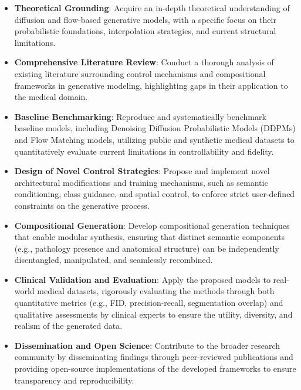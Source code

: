 \begin{itemize}
    \item \textbf{Theoretical Grounding}: Acquire an in-depth theoretical understanding of diffusion and flow-based generative models, with a specific focus 
    on their probabilistic foundations, interpolation strategies, and current structural limitations. 
    \item \textbf{Comprehensive Literature Review}: Conduct a thorough analysis of existing literature surrounding control mechanisms and compositional frameworks in 
    generative modeling, highlighting gaps in their application to the medical domain.
    \item \textbf{Baseline Benchmarking}: Reproduce and systematically benchmark baseline models, including Denoising Diffusion Probabilistic Models (DDPMs) and Flow 
    Matching models, utilizing public and synthetic medical datasets to quantitatively evaluate current limitations in controllability and fidelity. 
    \item \textbf{Design of Novel Control Strategies}: Propose and implement novel architectural modifications and training mechanisms, such as semantic conditioning, 
    class guidance, and spatial control, to enforce strict user-defined constraints on the generative process.
    \item \textbf{Compositional Generation}: Develop compositional generation techniques that enable modular synthesis, ensuring that distinct semantic components 
    (e.g., pathology presence and anatomical structure) can be independently disentangled, manipulated, and seamlessly recombined.
    \item \textbf{Clinical Validation and Evaluation}: Apply the proposed models to real-world medical datasets, rigorously evaluating the methods through both quantitative 
    metrics (e.g., FID, precision-recall, segmentation overlap) and qualitative assessments by clinical experts to ensure the utility, diversity, and 
    realism of the generated data. 
    \item \textbf{Dissemination and Open Science}: Contribute to the broader research community by disseminating findings through peer-reviewed publications 
    and providing open-source implementations of the developed frameworks to ensure transparency and reproducibility.
\end{itemize}





